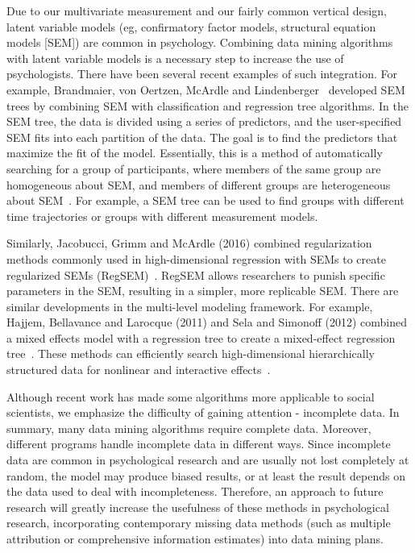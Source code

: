 Due to our multivariate measurement and our fairly common vertical
 design, latent variable models (eg, confirmatory factor models, 
structural equation models [SEM]) are common in psychology. 
Combining data mining algorithms with latent variable models is a 
necessary step to increase the use of psychologists. There have 
been several recent examples of such integration. For example, 
Brandmaier, von Oertzen, McArdle and Lindenberger~\cite{editor11} developed 
SEM trees by combining SEM with classification and regression 
tree algorithms. In the SEM tree, the data is divided using a 
series of predictors, and the user-specified SEM fits into each 
partition of the data. The goal is to find the predictors that 
maximize the fit of the model. Essentially, this is a method of 
automatically searching for a group of participants, where members
 of the same group are homogeneous about SEM, and members of 
different groups are heterogeneous about SEM~\cite{editor11}. 
For example, a SEM tree can be used to
 find groups with different time trajectories or groups with 
different measurement models.

Similarly, Jacobucci, Grimm and McArdle (2016) combined 
regularization methods commonly used in high-dimensional regression
 with SEMs to create regularized SEMs (RegSEM)~\cite{editor11}. 
RegSEM allows 
researchers to punish specific parameters in the SEM, resulting in
 a simpler, more replicable SEM. There are similar developments in
 the multi-level modeling framework. For example, Hajjem, 
Bellavance and Larocque (2011) and Sela and Simonoff (2012) combined
 a mixed effects model with a regression tree to create a 
mixed-effect regression tree~\cite{editor11}. 
These methods can efficiently search
 high-dimensional hierarchically structured data for nonlinear and
 interactive effects~\cite{editor11}.

Although recent work has made some algorithms more applicable to 
social scientists, we emphasize the difficulty of gaining 
attention - incomplete data. In summary, many data mining 
algorithms require complete data. Moreover, different programs 
handle incomplete data in different ways. Since incomplete data are
 common in psychological research and are usually not lost 
completely at random, the model may produce biased results, or at 
least the result depends on the data used to deal with 
incompleteness. Therefore, an approach to future research will 
greatly increase the usefulness of these methods in psychological 
research, incorporating contemporary missing data methods (such as
 multiple attribution or comprehensive information estimates) into
 data mining plans.

